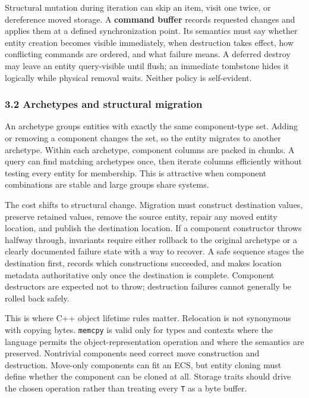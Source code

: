 Structural mutation during iteration can skip an item, visit one twice, or dereference moved storage. A \textbf{command buffer} records requested changes and applies them at a defined synchronization point. Its semantics must say whether entity creation becomes visible immediately, when destruction takes effect, how conflicting commands are ordered, and what failure means. A deferred destroy may leave an entity query-visible until flush; an immediate tombstone hides it logically while physical removal waits. Neither policy is self-evident.

\subsubsection{3.2 Archetypes and structural migration}\label{05-engine-i-ch008-archetypes-and-structural-migration}

\hypertarget{05-engine-i-ch008-archetypes-and-structural-migration}{}

An archetype groups entities with exactly the same component-type set. Adding or removing a component changes the set, so the entity migrates to another archetype. Within each archetype, component columns are packed in chunks. A query can find matching archetypes once, then iterate columns efficiently without testing every entity for membership. This is attractive when component combinations are stable and large groups share systems.

The cost shifts to structural change. Migration must construct destination values, preserve retained values, remove the source entity, repair any moved entity location, and publish the destination location. If a component constructor throws halfway through, invariants require either rollback to the original archetype or a clearly documented failure state with a way to recover. A safe sequence stages the destination first, records which constructions succeeded, and makes location metadata authoritative only once the destination is complete. Component destructors are expected not to throw; destruction failures cannot generally be rolled back safely.

This is where C++ object lifetime rules matter. Relocation is not synonymous with copying bytes. \texttt{memcpy} is valid only for types and contexts where the language permits the object-representation operation and where the semantics are preserved. Nontrivial components need correct move construction and destruction. Move-only components can fit an ECS, but entity cloning must define whether the component can be cloned at all. Storage traits should drive the chosen operation rather than treating every \texttt{T} as a byte buffer.

